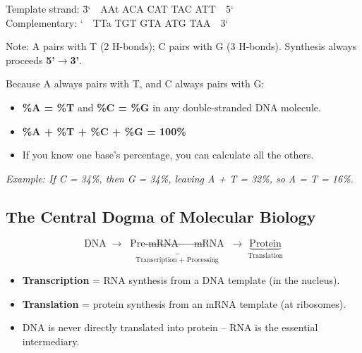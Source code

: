 \documentclass[11pt, letterpaper]{article}
\begin{document}
\begin{tcolorbox}[colback=part4bg, colframe=sectionorange, arc=3pt, boxrule=1pt]
\ttfamily\small
\begin{tabbing}
Template strand: \quad \= 3\textquoteleft\ \ AAt ACA CAT TAC ATT\ \ 5\textquoteleft \\
Complementary:         \textquoteleft\ \ TTa TGT GTA ATG TAA\ \ 3\textquoteleft
\end{tabbing}
\normalfont
\vspace{2pt}
\footnotesize Note: A pairs with T (2 H-bonds); C pairs with G (3 H-bonds). Synthesis always proceeds \textbf{5'$\to$3'}.
\end{tcolorbox}

\begin{tcolorbox}[colback=craapbg, colframe=craapborder,
  title={\bfseries Chargaff's Rules -- Base Pairing Percentages}, arc=4pt, boxrule=1pt]
Because A always pairs with T, and C always pairs with G:
\begin{itemize}[noitemsep, leftmargin=*]
  \item \textbf{\%A = \%T} and \textbf{\%C = \%G} in any double-stranded DNA molecule.
  \item \textbf{\%A + \%T + \%C + \%G = 100\%}
  \item If you know one base's percentage, you can calculate all the others.
\end{itemize}
\textit{Example: If C = 34\%, then G = 34\%, leaving A + T = 32\%, so A = T = 16\%.}
\end{tcolorbox}

\subsection*{The Central Dogma of Molecular Biology}
\[
  \text{DNA} \;\longrightarrow\; \underbrace{\text{Pre-mRNA} \;\longrightarrow\; \text{mRNA}}_{\text{Transcription + Processing}} \;\longrightarrow\; \underbrace{\text{Protein}}_{\text{Translation}}
\]

\begin{itemize}[noitemsep]
  \item \textbf{Transcription} = RNA synthesis from a DNA template (in the nucleus).
  \item \textbf{Translation} = protein synthesis from an mRNA template (at ribosomes).
  \item DNA is never directly translated into protein -- RNA is the essential intermediary.
\end{itemize}
\end{document}
